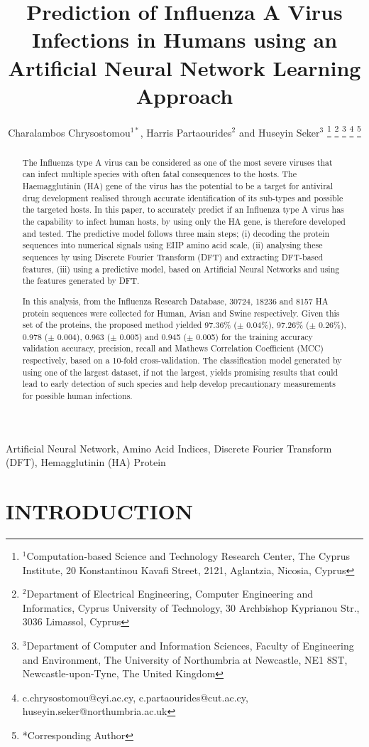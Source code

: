 \documentclass[letterpaper, 10 pt, conference]{ieeeconf}  %
\title{\LARGE \bf
Prediction of Influenza A Virus Infections in Humans using an Artificial Neural Network Learning Approach
}
\author{Charalambos Chrysostomou$^{1*}$, Harris Partaourides$^{2}$ and Huseyin Seker$^{3}$%
\thanks{$^{1}$Computation-based Science and Technology Research Center, The Cyprus Institute, 20 Konstantinou Kavafi Street, 2121, Aglantzia, Nicosia, Cyprus}%
\thanks{$^{2}$Department of Electrical Engineering, Computer Engineering and Informatics, Cyprus University of Technology, 30 Archbishop Kyprianou Str., 3036 Limassol, Cyprus}%
\thanks{$^{3}$Department of Computer and Information Sciences, Faculty of Engineering and Environment, The University of Northumbria at Newcastle, NE1 8ST, Newcastle-upon-Tyne, The United Kingdom}%
\thanks{c.chrysostomou@cyi.ac.cy, c.partaourides@cut.ac.cy, huseyin.seker@northumbria.ac.uk}%
\thanks{*Corresponding Author}%
}
\begin{document}
\maketitle
\thispagestyle{empty}
\pagestyle{empty}


\begin{abstract}


The Influenza type A virus can be considered as one of the most severe viruses that can infect multiple species with often fatal consequences to the hosts. The Haemagglutinin (HA) gene of the virus has the potential to be a target for antiviral drug development realised through accurate identification of its sub-types and possible the targeted hosts. In this paper, to accurately predict if an Influenza type A virus has the capability to infect human hosts, by using only the HA gene, is therefore developed and tested. The predictive model follows three main steps; (i) decoding the protein sequences into numerical signals using EIIP amino acid scale, (ii) analysing these sequences by using Discrete Fourier Transform (DFT) and extracting DFT-based features, (iii) using a predictive model, based on Artificial Neural Networks and using the features generated by DFT. 

In this analysis, from the Influenza Research Database, 30724, 18236 and 8157 HA protein sequences were collected for Human, Avian and Swine respectively. Given this set of the proteins, the proposed method yielded 97.36\% ($\pm$ 0.04\%), 97.26\% ($\pm$ 0.26\%), 0.978 ($\pm$ 0.004), 0.963 ($\pm$ 0.005) and 0.945 ($\pm$ 0.005) for the training accuracy validation accuracy, precision, recall and Mathews Correlation Coefficient (MCC) respectively, based on a 10-fold cross-validation.  The classification model generated by using one of the largest dataset, if not the largest, yields promising results that could lead to early detection of such species and help develop  precautionary measurements for possible human infections.

\end{abstract}

\begin{keywords}
Artificial Neural Network, Amino Acid Indices, Discrete Fourier Transform (DFT), Hemagglutinin (HA) Protein
\end{keywords}

\section{INTRODUCTION}
\end{document}
